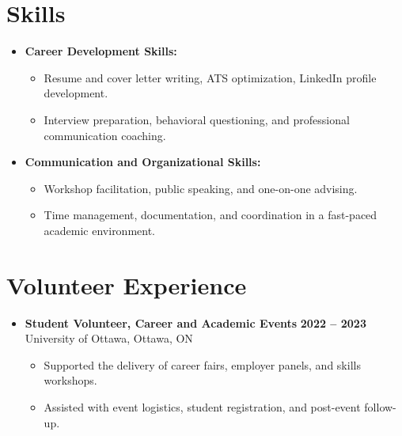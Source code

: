 \documentclass[a4paper,9pt]{article} %
\begin{document}
\section{Skills}
\begin{itemize}[leftmargin=0.15in, label={}]

    \item \textbf{Career Development Skills:}
    \begin{itemize}[leftmargin=0.3in, label={-}]
        \item Resume and cover letter writing, ATS optimization, LinkedIn profile development.
        \item Interview preparation, behavioral questioning, and professional communication coaching.
    \end{itemize}

    \item \textbf{Communication and Organizational Skills:}
    \begin{itemize}[leftmargin=0.3in, label={-}]
        \item Workshop facilitation, public speaking, and one-on-one advising.
        \item Time management, documentation, and coordination in a fast-paced academic environment.
    \end{itemize}

\end{itemize}

\section{Volunteer Experience}
\begin{itemize}[leftmargin=0.15in, label={}]

\item \textbf{Student Volunteer, Career and Academic Events} \hfill \textbf{2022 -- 2023}\\
University of Ottawa, Ottawa, ON
\begin{itemize}[leftmargin=0.3in, label={-}]
    \item Supported the delivery of career fairs, employer panels, and skills workshops.
    \item Assisted with event logistics, student registration, and post-event follow-up.
\end{itemize}

\end{itemize}
\end{document}
